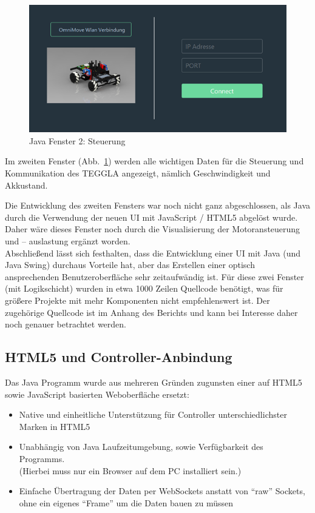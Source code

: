 \begin{figure}[!ht]
	\centering
	\includegraphics[width=\textwidth]{bilder/java2.png}
	\caption{Java Fenster 2: Steuerung}
	\label{bild:java2}
\end{figure}

Im zweiten Fenster (Abb.~\ref{bild:java2}) werden alle wichtigen Daten für die Steuerung
und Kommunikation des TEGGLA angezeigt, nämlich Geschwindigkeit und Akkustand.

Die Entwicklung des zweiten Fensters war noch nicht ganz abgeschlossen, als Java
durch die Verwendung der neuen UI mit JavaScript / HTML5 abgelöst wurde. Daher
wäre dieses Fenster noch durch die Visualisierung der Motoransteuerung und –
auslastung ergänzt worden.\\

Abschließend lässt sich festhalten, dass die Entwicklung einer UI mit Java (und Java Swing) durchaus Vorteile hat, aber das Erstellen einer optisch ansprechenden Benutzeroberfläche sehr zeitaufwändig ist. 
Für diese zwei Fenster (mit Logikschicht) wurden in etwa 1000 Zeilen Quellcode benötigt, was für größere Projekte mit mehr Komponenten nicht empfehlenswert ist. 
Der zugehörige Quellcode ist im Anhang des Berichts und kann bei Interesse daher noch genauer betrachtet werden.



\subsection{HTML5 und Controller-Anbindung}

Das Java Programm wurde aus mehreren Gründen zugunsten einer auf HTML5 sowie JavaScript basierten Weboberfläche ersetzt:\par

\begin{itemize}
	\item Native und einheitliche Unterstützung für Controller unterschiedlichster Marken in HTML5\par
	
	\item Unabhängig von Java Laufzeitumgebung, sowie Verfügbarkeit des Programms.\\
	(Hierbei muss nur ein Browser auf dem PC installiert sein.)\par
	
	\item Einfache Übertragung der Daten per WebSockets anstatt von ``raw''  Sockets, ohne ein eigenes ``Frame'' um die Daten bauen zu müssen
\end{itemize}\par


